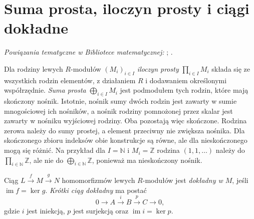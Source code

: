\section{Suma prosta, iloczyn prosty i ciągi dokładne}

\noindent\emph{Powiązania tematyczne w Bibliotece matematycznej:} ; .

\begin{definicja}
\label{aa:def:modules-direct-sum}
Dla rodziny lewych $R$-modułów $(M_i)_{i\in I}$
\emph{iloczyn prosty} $\prod_{i\in I}M_i$ składa się
ze wszystkich rodzin elementów, z działaniem
$R$ i dodawaniem określonymi współrzędnie.
\emph{Suma prosta} $\bigoplus_{i\in I}M_i$ jest
podmodułem tych rodzin, które mają skończony nośnik.
Istotnie, nośnik sumy dwóch rodzin jest zawarty
w sumie mnogościowej ich nośników, a nośnik
rodziny pomnożonej przez skalar jest zawarty
w nośniku wyjściowej rodziny. Oba pozostają więc
skończone. Rodzina zerowa należy do sumy prostej,
a element przeciwny nie zwiększa nośnika.
Dla skończonego zbioru indeksów obie konstrukcje
są równe, ale dla nieskończonego mogą się różnić.
Na przykład dla $I=\mathbb N$ i $M_i=\mathbb Z$
rodzina $(1,1,\ldots)$ należy do
$\prod_{i\in\mathbb N}\mathbb Z$, ale nie do
$\bigoplus_{i\in\mathbb N}\mathbb Z$, ponieważ
ma nieskończony nośnik.
\end{definicja}

\begin{definicja}
\label{aa:def:modules-exact}
Ciąg $L\xrightarrow{f}M\xrightarrow{g}N$
homomorfizmów lewych $R$-modułów jest \emph{dokładny
w $M$}, jeśli $\operatorname{im}f=\ker g$.
\emph{Krótki ciąg dokładny} ma postać
\[
0\longrightarrow A\xrightarrow{i}B
 \xrightarrow{p}C\longrightarrow0,
\]
gdzie $i$ jest iniekcją, $p$ jest surjekcją oraz
$\operatorname{im}i=\ker p$.
\end{definicja}

